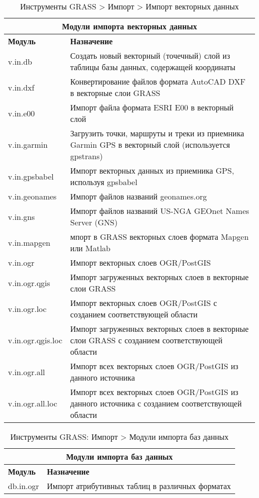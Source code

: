 {\renewcommand{\arraystretch}{0.7}
\begin{table}[htb]
\centering
 \begin{tabular}{|p{2.5cm}|p{11.5cm}|}
  \hline \multicolumn{2}{|c|}{\textbf{Модули импорта векторных данных}} \\
  \hline \textbf{Модуль} & \textbf{Назначение} \\
  \hline v.in.db & Создать новый векторный (точечный) слой из таблицы
  базы данных, содержащей координаты \\
  \hline v.in.dxf & Конвертирование файлов формата AutoCAD DXF в векторные
  слои GRASS \\
  \hline v.in.e00 & Импорт файла формата ESRI E00 в векторный слой \\
  \hline v.in.garmin & Загрузить точки, маршруты и треки из приемника
  Garmin GPS в векторный слой (используется gpstrans) \\
  \hline v.in.gpsbabel & Импорт векторных данных из приемника GPS,
  используя gpsbabel \\
  \hline v.in.geonames & Импорт файлов названий geonames.org \\
  \hline v.in.gns & Импорт файлов названий US-NGA GEOnet Names Server (GNS) \\
  \hline v.in.mapgen & мпорт в GRASS векторных слоев формата Mapgen
  или Matlab \\
  \hline v.in.ogr & Импорт векторных слоев OGR/PostGIS \\
  \hline v.in.ogr.qgis & Импорт загруженных векторных слоев в векторные
  слои GRASS \\
  \hline v.in.ogr.loc & Импорт векторных слоев OGR/PostGIS с созданием
  соответствующей области \\
  \hline v.in.ogr.qgis.loc & Импорт загруженных векторных слоев в
  векторные слои GRASS с созданием соответствующей области \\
  \hline v.in.ogr.all & Импорт всех векторных слоев OGR/PostGIS из
  данного источника \\
  \hline v.in.ogr.all.loc & Импорт всех векторных слоев OGR/PostGIS из
  данного источника с созданием соответствующей области \\
\hline
\end{tabular}
\caption{Инструменты GRASS > Импорт > Импорт векторных данных}
\end{table}}

{\renewcommand{\arraystretch}{0.7}
\begin{table}[H]
\centering
 \begin{tabular}{|p{2.5cm}|p{11.5cm}|}
  \hline \multicolumn{2}{|c|}{\textbf{Модули импорта баз данных}} \\
  \hline \textbf{Модуль} & \textbf{Назначение} \\
  \hline db.in.ogr & Импорт атрибутивных таблиц в различных форматах \\
\hline
\end{tabular}
\caption{Инструменты GRASS: Импорт > Модули импорта баз данных}
\end{table}}

